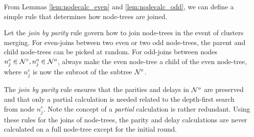 %
%
%

From Lemmas \ref{lem:nodecalc_even} and \ref{lem:nodecalc_odd}, we can define a simple rule that determines how node-trees are joined.

\begin{definition}\label{def:joinbyparity}
  Let the \emph{join by parity} rule govern how to join node-trees in the event of clusters merging. For even-joins between two even or two odd node-trees, the parent and child node-trees can be picked at random. For odd-joins between nodes $n_j^e \in \mathcal{N}^e, n_j^o \in \mathcal{N}^o$, always make the even node-tree a child of the even node-tree, where $n_j^e$ is now the subroot of the subtree $\mathcal{N}^e$.
\end{definition}
The \emph{join by parity} rule ensures that the parities and delays in $\mathcal{N}^o$ are preserved and that only a partial calculation is needed related to the depth-first search from node $n_j^e$. Note the concept of a \emph{partial} calculation is rather redundant. Using these rules for the joins of node-trees, the parity and delay calculations are never calculated on a full node-tree except for the initial round. 

